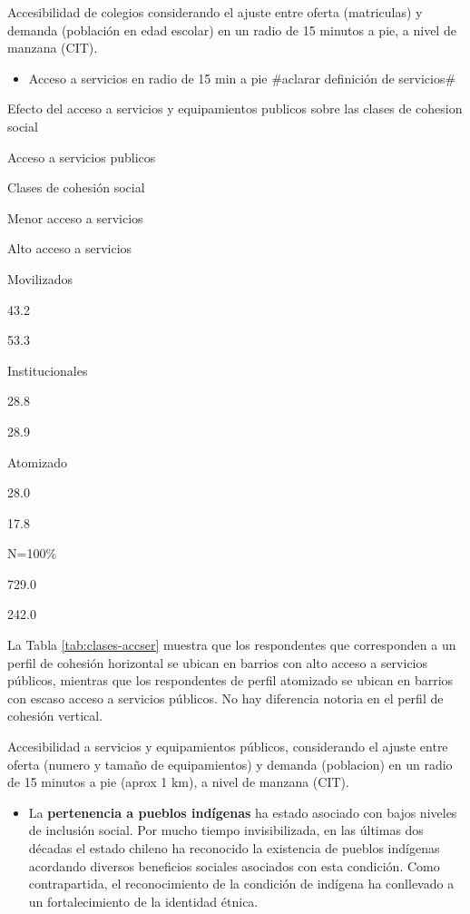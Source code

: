 \documentclass[
  12pt,
]{book}
\providecommand{\tightlist}{%
  \setlength{\itemsep}{0pt}\setlength{\parskip}{0pt}}
\begin{document}
Accesibilidad de colegios considerando el ajuste entre oferta (matriculas) y demanda (población en edad escolar) en un radio de 15 minutos a pie, a nivel de manzana (CIT).

\begin{itemize}
\tightlist
\item
  Acceso a servicios en radio de 15 min a pie \#aclarar definición de servicios\#
\end{itemize}

\label{tab:clases-accser}Efecto del acceso a servicios y equipamientos publicos sobre las clases de cohesion social

Acceso a servicios publicos

Clases de cohesión social

Menor acceso a servicios

Alto acceso a servicios

Movilizados

43.2

53.3

Institucionales

28.8

28.9

Atomizado

28.0

17.8

N=100\%

729.0

242.0

La Tabla \ref{tab:clases-accser} muestra que los respondentes que corresponden a un perfil de cohesión horizontal se ubican en barrios con alto acceso a servicios públicos, mientras que los respondentes de perfil atomizado se ubican en barrios con escaso acceso a servicios públicos. No hay diferencia notoria en el perfil de cohesión vertical.

Accesibilidad a servicios y equipamientos públicos, considerando el ajuste entre oferta (numero y tamaño de equipamientos) y demanda (poblacion) en un radio de 15 minutos a pie (aprox 1 km), a nivel de manzana (CIT).

\begin{itemize}
\tightlist
\item
  La \textbf{pertenencia a pueblos indígenas} ha estado asociado con bajos niveles de inclusión social. Por mucho tiempo invisibilizada, en las últimas dos décadas el estado chileno ha reconocido la existencia de pueblos indígenas acordando diversos beneficios sociales asociados con esta condición. Como contrapartida, el reconocimiento de la condición de indígena ha conllevado a un fortalecimiento de la identidad étnica.
\end{itemize}
\end{document}
